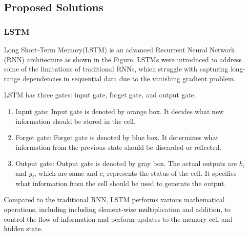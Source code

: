 






\subsection{Proposed Solutions}
\subsubsection{LSTM}
Long Short-Term Memory(LSTM) is an advanced Recurrent Neural Network (RNN) architecture 
as shown in the Figure. 
LSTMs were introduced to address some of the limitations of traditional RNNs, 
which struggle with capturing long-range dependencies in sequential data due to the vanishing gradient problem.

LSTM has three gates: input gate, forget gate, and output gate.
\begin{enumerate}
	\item Input gate: 	Input gate is denoted by orange box. It decides what new information should be stored in the cell.
	\item Forget gate:	Forget gate is denoted by blue box. It determines what information from the previous state should be discarded or reflected.
	\item Output gate:	Output gate is denoted by gray box. The actual outputs are $h_{i}$ and $y_{i}$, which are same and $c_{i}$ represents the status of the cell. It specifies what information from the cell should be used to generate the output.
\end{enumerate}

Compared to the traditional RNN, LSTM performs various mathematical operations, including including element-wise multiplication and addition, to control the flow of information and perform updates to the memory cell and hidden state.

